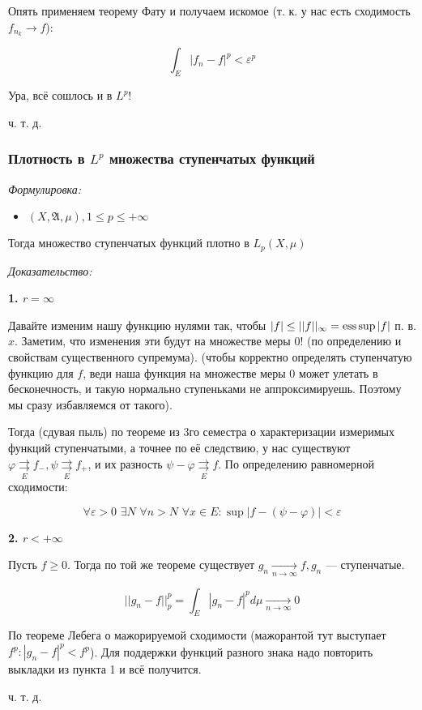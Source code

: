 \documentclass{article}
\def\dbl{\,\,}
\def\rsh#1{\underset{#1}{\rightrightarrows}}
\def\rshe{\rsh{E}}
\def\goesto#1{\underset{#1}{\longrightarrow}}
\def\toinf#1{\goesto{#1 \rightarrow \infty}}
\def\ntoinf{\toinf{n}}
\begin{document}
Опять применяем теорему Фату и получаем искомое (т. к. у нас есть сходимость $f_{n_k} \rightarrow f$):

\[\int_{E} |f_n - f|^p < \varepsilon^p\]

Ура, всё сошлось и в $L^p$!

ч. т. д. 

\subsubsection{Плотность в $L^p$ множества ступенчатых функций}
\textit{Формулировка:}

\begin{itemize}
    \item $(X, \mathfrak{A}, \mu), 1 \le p \le +\infty$
\end{itemize}

Тогда множество ступенчатых функций плотно в $L_p(X, \mu)$

\textit{Доказательство:}

\textbf{1. $r = \infty$}

Давайте изменим нашу функцию нулями так, чтобы $|f| \le ||f||_{\infty} = \operatorname*{ess\,sup} |f|$ п. в. $x$. Заметим, что изменения эти будут на множестве меры 0! (по определению и свойствам существенного супремума). (чтобы корректно определять ступенчатую функцию для $f$, веди наша функция на множестве меры 0 может улетать в бесконечность, и такую нормально ступеньками не аппроксимируешь. Поэтому мы сразу избавляемся от такого).

Тогда (сдувая пыль) по теореме из 3го семестра о характеризации измеримых функций ступенчатыми, а точнее по её следствию, у нас существуют $\varphi \rshe f_-, \psi \rshe f_+$, и их разность $\psi - \varphi \rshe f$. По определению равномерной сходимости:

\[\forall \varepsilon > 0 \dbl \exists N \dbl \forall n > N \dbl \forall x \in E: \sup |f - (\psi - \varphi)| < \varepsilon\]

\textbf{2. $r < +\infty$}

Пусть $f \ge 0$. Тогда по той же теореме существует $g_n \ntoinf f, g_n$ --- ступенчатые.

\[||g_n - f||_p^p = \int_{E} |g_n - f| ^p d\mu \ntoinf 0\]

По теореме Лебега о мажорируемой сходимости (мажорантой тут выступает $f^p: |g_n - f|^p < f^p$). Для поддержки функций разного знака надо повторить выкладки из пункта 1 и всё получится.

ч. т. д. 
\end{document}
